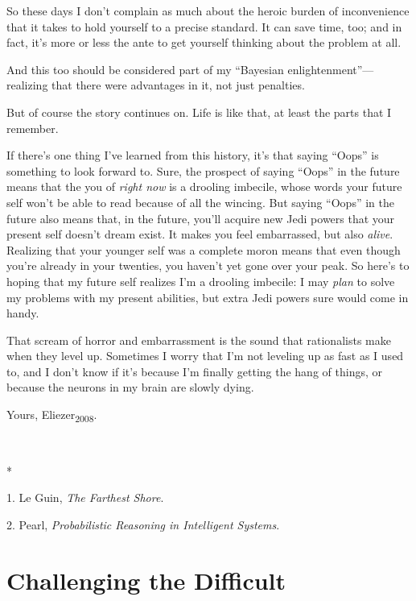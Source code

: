 {
 So these days I don't complain as much about the
heroic burden of inconvenience that it takes to hold yourself to a
precise standard. It can save time, too; and in fact,
it's more or less the ante to get yourself thinking
about the problem at all.}

{
 And this too should be considered part of my
``Bayesian
enlightenment''---realizing that there were
advantages in it, not just penalties.}

{
 But of course the story continues on. Life is like that, at least
the parts that I remember.}

{
 If there's one thing I've learned
from this history, it's that saying
``Oops'' is something to look
forward to. Sure, the prospect of saying
``Oops'' in the future means that
the you of \textit{right now} is a drooling imbecile, whose words your
future self won't be able to read because of all the
wincing. But saying ``Oops'' in the
future also means that, in the future, you'll acquire
new Jedi powers that your present self doesn't dream
exist. It makes you feel embarrassed, but also \textit{alive}.
Realizing that your younger self was a complete moron means that even
though you're already in your twenties, you
haven't yet gone over your peak. So
here's to hoping that my future self realizes
I'm a drooling imbecile: I may \textit{plan} to solve
my problems with my present abilities, but extra Jedi powers sure would
come in handy.}

{
 That scream of horror and embarrassment is the sound that
rationalists make when they level up. Sometimes I worry that
I'm not leveling up as fast as I used to, and I
don't know if it's because
I'm finally getting the hang of things, or because the
neurons in my brain are slowly dying.}

{
 Yours, Eliezer\textsubscript{2008}.}

{\centering
 \ ~
\par}

{\centering
 *
\par}


\bigskip

{
 1. Le Guin, \textit{The Farthest Shore}.}

{
 2. Pearl, \textit{Probabilistic Reasoning in Intelligent
Systems}.}

\chapter{Challenging the Difficult}

